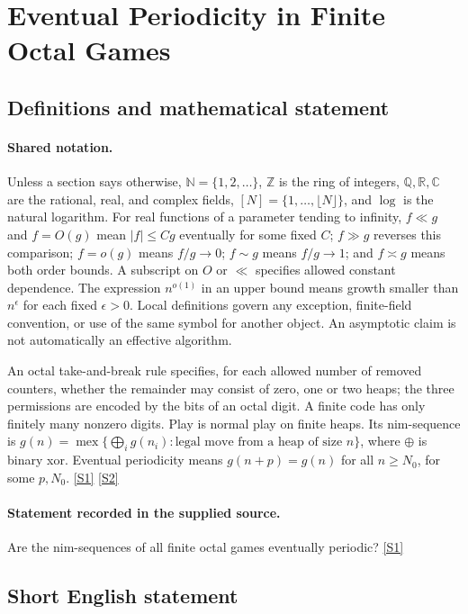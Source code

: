 \documentclass[11pt,a4paper]{article}
\newcommand{\N}{\mathbb{N}}
\newcommand{\Z}{\mathbb{Z}}
\newcommand{\Q}{\mathbb{Q}}
\newcommand{\R}{\mathbb{R}}
\newcommand{\C}{\mathbb{C}}
\newcommand{\sref}[2]{\hyperlink{source:#1:#2}{[S#2]}}
\begin{document}
\section{Eventual Periodicity in Finite Octal Games}\label{statement}


\subsection{Definitions and mathematical statement}

\paragraph{Shared notation.}Unless a section says otherwise, $\N=\{1,2,\ldots\}$,
$\Z$ is the ring of integers, $\Q,\R,\C$ are the rational, real, and complex
fields, $[N]=\{1,\ldots,\lfloor N\rfloor\}$, and $\log$ is the natural
logarithm. For real functions of a parameter tending to infinity,
$f\ll g$ and $f=O(g)$ mean $|f|\leq Cg$ eventually for some fixed $C$;
$f\gg g$ reverses this comparison; $f=o(g)$ means $f/g\to0$;
$f\sim g$ means $f/g\to1$; and $f\asymp g$ means both order bounds.
A subscript on $O$ or $\ll$ specifies allowed constant dependence.
The expression $n^{o(1)}$ in an upper bound means growth smaller than
$n^\epsilon$ for each fixed $\epsilon>0$. Local definitions govern any
exception, finite-field convention, or use of the same symbol for another
object. An asymptotic claim is not automatically an effective algorithm.



An octal take-and-break rule specifies, for each allowed number of removed counters, whether the remainder may consist of zero, one or two heaps; the three permissions are encoded by the bits of an octal digit. A finite code has only finitely many nonzero digits. Play is normal play on finite heaps. Its nim-sequence is $g(n)=\operatorname{mex}\{\bigoplus_i g(n_i):\text{legal move from a heap of size }n\}$, where $\oplus$ is binary xor. Eventual periodicity means $g(n+p)=g(n)$ for all $n\geq N_0$, for some $p,N_0$. \sref{statement}{1} \sref{statement}{2}

\paragraph{Statement recorded in the supplied source.}
Are the nim-sequences of all finite octal games eventually periodic? \sref{statement}{1}

\subsection{Short English statement}
\end{document}
